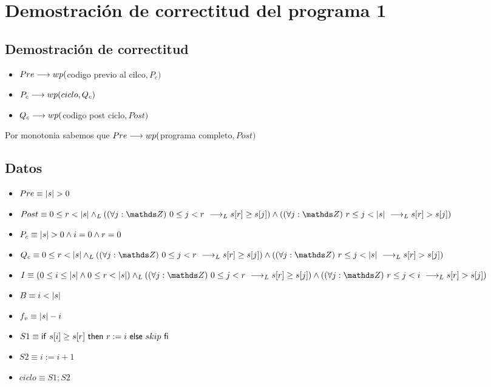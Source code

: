 \documentclass{article}
\begin{document}
\section*{Demostración de correctitud del programa 1}

\subsection*{Demostración de correctitud}

\begin{itemize}
    \item $Pre \longrightarrow wp($codigo previo al cilco$,P_{c})$
    \item $P_{c} \longrightarrow wp(ciclo, Q_{c})$
    \item $Q_{c} \longrightarrow wp($codigo post ciclo$,Post)$
\end{itemize}

Por monotonia sabemos que $Pre \longrightarrow wp($programa completo$, Post)$

\subsection*{Datos}

\begin{itemize}
    \item $Pre      \equiv |s| > 0$
    \item $Post     \equiv 0 \leq r < \longitud{s} \yLuego (\paraTodo{j}{0}{r} \implicaLuego s[r] \geq s[j]) \wedge (\paraTodo{j}{r}{\longitud{s}}\implicaLuego s[r] > s[j])$
    \item $P_{c}    \equiv |s| > 0 \wedge i = 0 \wedge r = 0$
    \item $Q_{c}    \equiv 0 \leq r < \longitud{s} \yLuego (\paraTodo{j}{0}{r} \implicaLuego s[r] \geq s[j]) \wedge (\paraTodo{j}{r}{\longitud{s}}\implicaLuego s[r] > s[j])$
    \item $I        \equiv (0 \leq i \leq \longitud{s} \wedge 0 \leq r < \longitud{s}) \yLuego (\paraTodo{j}{0}{r} \implicaLuego s[r] \geq s[j]) \wedge (\paraTodo{j}{r}{i}\implicaLuego s[r] > s[j])$
    \item $B        \equiv i < |s|$
    \item $f_{v}    \equiv |s| - i$
    \item $S1       \equiv \mathsf{if}\ s[i] \geq s[r]\ \mathsf{then}\ r:= i\ \mathsf{else}\ skip\ \mathsf{fi}$
    \item $S2       \equiv i:= i + 1$
    \item $ciclo    \equiv S1; S2$
\end{itemize}
\end{document}
